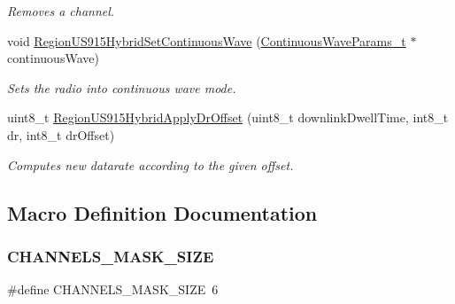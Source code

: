 \begin{DoxyCompactItemize}
\begin{DoxyCompactList}\small\item\em Removes a channel. \end{DoxyCompactList}\item 
void \hyperlink{group__REGIONUS915HYB_gad7b0e2c75aff473cd0c4287d4c6f24d1}{Region\+U\+S915\+Hybrid\+Set\+Continuous\+Wave} (\hyperlink{group__REGION_gaf39bb5ba06921139c6d17f88a8d518cd}{Continuous\+Wave\+Params\+\_\+t} $\ast$continuous\+Wave)
\begin{DoxyCompactList}\small\item\em Sets the radio into continuous wave mode. \end{DoxyCompactList}\item 
uint8\+\_\+t \hyperlink{group__REGIONUS915HYB_gaa90275764dd76f7122c3253d2eab2c2f}{Region\+U\+S915\+Hybrid\+Apply\+Dr\+Offset} (uint8\+\_\+t downlink\+Dwell\+Time, int8\+\_\+t dr, int8\+\_\+t dr\+Offset)
\begin{DoxyCompactList}\small\item\em Computes new datarate according to the given offset. \end{DoxyCompactList}\end{DoxyCompactItemize}


\subsection{Macro Definition Documentation}
\mbox{\label{RegionUS915-Hybrid_8c_a1b20a8de3ae59c0b063fb313f0c70890}} 
\subsubsection{\texorpdfstring{C\+H\+A\+N\+N\+E\+L\+S\+\_\+\+M\+A\+S\+K\+\_\+\+S\+I\+ZE}{CHANNELS\_MASK\_SIZE}}
{\footnotesize\ttfamily \#define C\+H\+A\+N\+N\+E\+L\+S\+\_\+\+M\+A\+S\+K\+\_\+\+S\+I\+ZE~6}

